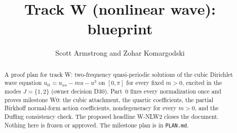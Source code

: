 \documentclass[11pt]{amsart}
\title{Track W (nonlinear wave): blueprint}
\author{Scott Armstrong and Zohar Komargodski}
\begin{document}
\begin{abstract}
A proof plan for track W: two-frequency quasi-periodic solutions of the cubic Dirichlet wave equation
$u_{tt}=u_{xx}-mu-u^3$ on $[0,\pi]$ for every fixed $m>0$, excited in the modes $J=\{1,2\}$ (owner decision D30).
Part~0 fixes every normalization once and proves milestone W0: the cubic attachment, the quartic coefficients, the
partial Birkhoff normal-form action coefficients, nondegeneracy for every $m>0$, and the Duffing consistency check.
The proposed headline W-NLW2 closes the document. Nothing here is frozen or approved. The milestone plan is in
\texttt{PLAN.md}.
\end{abstract}
\maketitle
\tableofcontents











\end{document}
